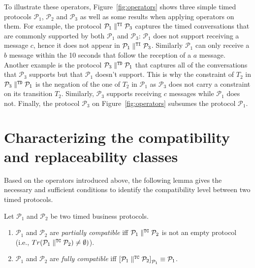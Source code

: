 To illustrate these operators, Figure~\ref{fig:operators} shows three simple timed protocols $\mathcal{P}_1$, $\mathcal{P}_2$ and $\mathcal{P}_3$ as well as some results when applying operators on them.
For example, the protocol $\mathcal{P}_1 \parallel^{\mathtt{TI}} \mathcal{P}_3$ captures the timed conversations that are commonly supported by both $\mathcal{P}_1$ and $\mathcal{P}_3$: $\mathcal{P}_1$ does not support receiving a message $c$, hence it does not appear in $\mathcal{P}_1 \parallel^{\mathtt{TI}} \mathcal{P}_3$. Similarly $\mathcal{P}_1$ can only receive a $b$ message within the 10 seconds that follow the reception of a $a$ message. Another example is the protocol $\mathcal{P}_3 \parallel^{\mathtt{TD}} \mathcal{P}_1$ that captures all of the conversations that $\mathcal{P}_3$ supports but that $\mathcal{P}_1$ doesn't support. This is why the \CInvoke constraint of $T_2$ in $\mathcal{P}_3 \parallel^{\mathtt{TD}} \mathcal{P}_1$ is the negation of the one of $T_2$ in $\mathcal{P}_1$ as $\mathcal{P}_3$ does not carry a \CInvoke constraint on its transition $T_2$. Similarly, $\mathcal{P}_3$ supports receiving $c$ messages while $\mathcal{P}_1$ does not. Finally, the protocol $\mathcal{P}_3$ on Figure~\ref{fig:operators} subsumes the protocol $\mathcal{P}_1$.


\section{Characterizing the compatibility and replaceability classes}


Based on the operators introduced above, the following lemma gives the necessary and sufficient conditions to identify the compatibility level between two timed protocols.

\begin{lemma}
Let $\mathcal{P}_1$ and $\mathcal{P}_2$ be two timed business protocols.
\begin{enumerate}

    \item $\mathcal{P}_1$ and $\mathcal{P}_2$ are \emph{partially compatible} iff $\mathcal{P}_1 \parallel^{\mathtt{TC}} \mathcal{P}_2$ is not an empty protocol (i.e., $Tr(\mathcal{P}_1 \parallel^{\mathtt{TC}} \mathcal{P}_2) \neq \emptyset)$).

    \item $\mathcal{P}_1$ and $\mathcal{P}_2$ are \emph{fully compatible} iff $\left[ \mathcal{P}_1 \parallel^{\mathtt{TC}} \mathcal{P}_2 \right]_{\mathcal{P}_1} \equiv \mathcal{P}_1$.

\end{enumerate}
\end{lemma}

